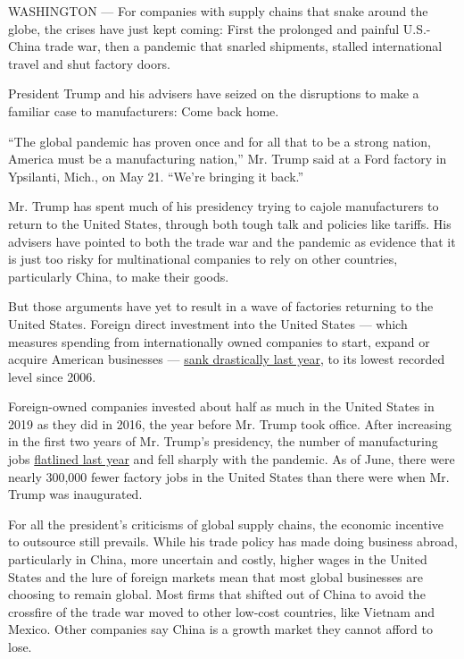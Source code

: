 WASHINGTON --- For companies with supply chains that snake around the
globe, the crises have just kept coming: First the prolonged and painful
U.S.-China trade war, then a pandemic that snarled shipments, stalled
international travel and shut factory doors.

President Trump and his advisers have seized on the disruptions to make
a familiar case to manufacturers: Come back home.

``The global pandemic has proven once and for all that to be a strong
nation, America must be a manufacturing nation,'' Mr. Trump said at a
Ford factory in Ypsilanti, Mich., on May 21. ``We're bringing it back.''

Mr. Trump has spent much of his presidency trying to cajole
manufacturers to return to the United States, through both tough talk
and policies like tariffs. His advisers have pointed to both the trade
war and the pandemic as evidence that it is just too risky for
multinational companies to rely on other countries, particularly China,
to make their goods.

But those arguments have yet to result in a wave of factories returning
to the United States. Foreign direct investment into the United States
--- which measures spending from internationally owned companies to
start, expand or acquire American businesses ---
\href{https://www.bea.gov/news/2020/new-foreign-direct-investment-united-states-2019}{sank
drastically last year}, to its lowest recorded level since 2006.

Foreign-owned companies invested about half as much in the United States
in 2019 as they did in 2016, the year before Mr. Trump took office.
After increasing in the first two years of Mr. Trump's presidency, the
number of manufacturing jobs
\href{https://www.bls.gov/iag/tgs/iag31-33.htm}{flatlined last year} and
fell sharply with the pandemic. As of June, there were nearly 300,000
fewer factory jobs in the United States than there were when Mr. Trump
was inaugurated.

For all the president's criticisms of global supply chains, the economic
incentive to outsource still prevails. While his trade policy has made
doing business abroad, particularly in China, more uncertain and costly,
higher wages in the United States and the lure of foreign markets mean
that most global businesses are choosing to remain global. Most firms
that shifted out of China to avoid the crossfire of the trade war moved
to other low-cost countries, like Vietnam and Mexico. Other companies
say China is a growth market they cannot afford to lose.

